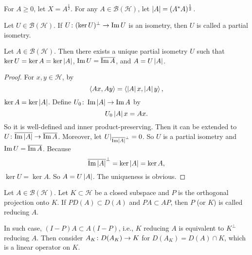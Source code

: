 \documentclass[a4paper,12pt]{article}
\begin{document}
\begin{defn}
    For $A \geq 0$, let $X = A^{\frac{1}{2}}$. For any $A \in \mathcal{B}(\mathcal{H})$, let $\left\lvert A\right\lvert = (A^*A)^{\frac{1}{2}}$.
\end{defn}

\begin{defn}
    Let $U \in \mathcal{B}(\mathcal{H})$. If $U \colon (\ker U)^\perp \rightarrow \operatorname{Im} U$ is an isometry, then $U$ is called a partial isometry.
\end{defn}

\begin{thm}
    Let $A \in \mathcal{B}(\mathcal{H})$. Then there exists a unique partial isometry $U$ such that $\ker U = \ker A = \ker \left\lvert A\right\lvert$, $\operatorname{Im} U = \overline{\operatorname{Im} A}$, and $A = U \left\lvert A\right\lvert$.
\end{thm}
\begin{proof}
    For $x,y \in \mathcal{H}$, by
    \begin{equation*}
        \left\langle Ax,Ay \right\rangle = \left\langle \left\lvert A\right\lvert x,\left\lvert A\right\lvert y \right\rangle,
    \end{equation*}
    $\ker A = \ker \left\lvert A\right\lvert$. Define $U_0 \colon \operatorname{Im} \left\lvert A\right\lvert \rightarrow \operatorname{Im} A$ by
    \begin{equation*}
        U_0 \left\lvert A\right\lvert x = Ax.
    \end{equation*}
    So it is well-defined and inner product-preserving. Then it can be extended to $U \colon \overline{\operatorname{Im} \left\lvert A\right\lvert} \rightarrow \overline{\operatorname{Im} A}$. Moreover, let $U |_{\overline{\operatorname{Im} \left\lvert A\right\lvert}^\perp} = 0$. So $U$ is a partial isometry and $\operatorname{Im} U = \overline{\operatorname{Im} A}$. Because
    \begin{equation*}
        \overline{\operatorname{Im} \left\lvert A\right\lvert}^\perp = \ker \left\lvert A\right\lvert = \ker A,
    \end{equation*}
    $\ker U = \ker A$. So $A = U \left\lvert A\right\lvert$. The uniqueness is obvious.
\end{proof}

\begin{defn}
    Let $A \in \mathcal{B}(\mathcal{H})$. Let $K \subset \mathcal{H}$ be a closed subspace and $P$ is the orthogonal projection onto $K$. If $PD(A) \subset D(A)$ and $PA \subset AP$, then $P$ (or $K$) is called reducing $A$.
\end{defn}
\begin{rmk}
    In such case, $(I - P) A \subset A (I - P)$, i.e., $K$ reducing $A$ is equivalent to $K^\perp$ reducing $A$. Then consider $A_K \colon D(A_K) \rightarrow K$ for $D(A_K) = D(A) \cap K$, which is a linear operator on $K$.
\end{rmk}
\end{document}
